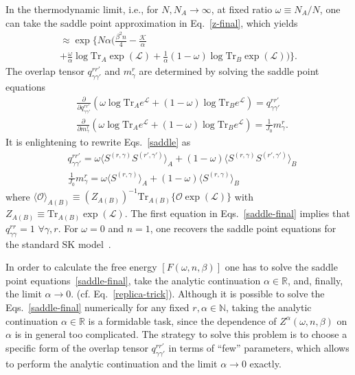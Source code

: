 \documentclass[twocolumn,superscriptaddress,prb,10pt]{revtex4-1}
\def\tr{\textrm{Tr}}
\begin{document}
In the thermodynamic limit, i.e., for $N,N_A\to\infty$, at fixed ratio 
$\omega\equiv N_A/N$, one can take the saddle point approximation in 
Eq.~\eqref{z-final}, which yields   
%
\begin{multline}
[Z^\alpha(\omega,n,\beta)]\approx
\exp\Big\{N\alpha\Big(\frac{\beta^2n}{4}-\frac{\mathcal K}{\alpha}\\
+\frac{\omega}{\alpha}\log\tr_A\exp({\mathcal L})+
\frac{1}{\alpha}(1-\omega)\log\tr_B\exp({\mathcal L})
\Big)\Big\}. 
\label{Z-ac}
\end{multline}
%
The overlap tensor $q_{\gamma\gamma'}^{rr'}$ and $m_\gamma^r$ are 
determined by solving the saddle point equations 
%
\begin{align}
\label{saddle}
& \frac{\partial}{\partial q_{\gamma\gamma'}^{rr'}}
\left(\omega\log\tr_A e^{{\mathcal L}}+(1-\omega)\log\tr_B 
e^{{\mathcal L}}\right)=q_{\gamma\gamma'}^{rr'}\\
\nonumber
& \frac{\partial}{\partial m_\gamma^r}\left(\omega\log\tr_A 
e^{{\mathcal L}}+(1-\omega)\log\tr_B e^{{\mathcal L}}\right)=
\frac{1}{J_0}m_\gamma^r.
\end{align}
%
It is enlightening to rewrite Eqs.~\eqref{saddle} as 
%
\begin{align}
\nonumber
& q_{\gamma\gamma'}^{rr'}=
\omega\langle S^{(r,\gamma)} S^{(r',\gamma')}\rangle_A+
(1-\omega)\langle S^{(r,\gamma)}S^{(r',\gamma')}
\rangle_B\\
& \frac{1}{J_0}m_\gamma^r=\omega\langle S^{(r,\gamma)}
\rangle_A+(1-\omega)\langle S^{(r,\gamma)}
\rangle_B
\label{saddle-final}
\end{align}
%
where $\langle {\mathcal O}\rangle_{A(B)}\equiv (Z_{A(B)})^{-1}
\tr_{A(B)}\{{\mathcal O}\exp({\mathcal L})\}$ with $Z_{A(B)}\equiv\tr_{A(B)}
\exp({\mathcal L})$. The first equation in Eqs.~\eqref{saddle-final} implies 
that $q_{\gamma\gamma}^{rr}=1$ $\forall\gamma,r$. For $\omega=0$ and $n=1$, 
one recovers the saddle point equations for the standard SK model~\cite{parisi-book,
nishimori-book}. 

In order to calculate the free energy $[F(\omega,n,\beta)]$ one has to solve 
the saddle point equations~\eqref{saddle-final}, take the analytic continuation 
$\alpha\in\mathbb{R}$, and, finally, the limit $\alpha\to 0$.  
(cf. Eq.~\eqref{replica-trick}). Although it is possible to solve the 
Eqs.~\eqref{saddle-final} numerically for any fixed $r,\alpha\in\mathbb{N}$, 
taking the analytic continuation $\alpha\in\mathbb{R}$ is a formidable task, 
since the dependence of $Z^\alpha(\omega,n,\beta)$ on $\alpha$ is in general 
too complicated. The strategy to solve this problem is to choose a specific form of 
the overlap tensor $q_{\gamma\gamma'}^{rr'}$ in terms of ``few'' parameters, which 
allows to perform the analytic continuation and the limit $\alpha\to 0$ exactly. 
\end{document}
